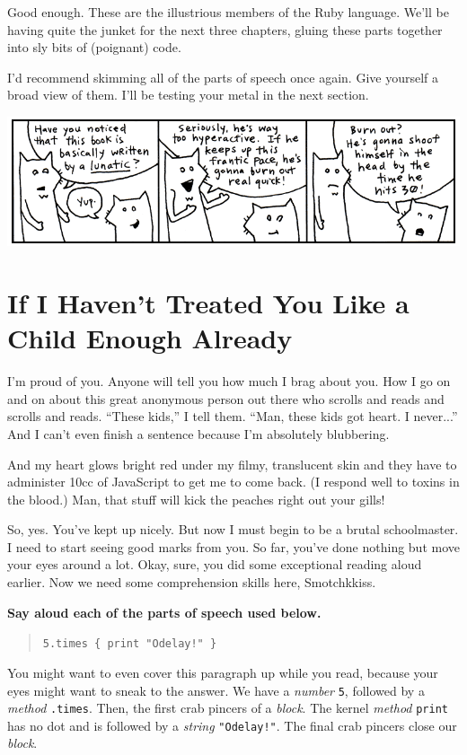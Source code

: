\documentclass[10pt,twoside]{report}
\begin{document}
Good enough.  These are the illustrious members of the Ruby language.
We'll be having quite the junket for the next three chapters, gluing
these parts together into sly bits of (poignant) code.

I'd recommend skimming all of the parts of speech once again.  Give
yourself a broad view of them.  I'll be testing your metal in the next
section.

	\includegraphics[width=1.0\textwidth]{cache/16.png}


\section{If I Haven't Treated You Like a Child Enough Already}


I'm proud of you.  Anyone will tell you how much I brag about you.
How I go on and on about this great anonymous person out there who
scrolls and reads and scrolls and reads.  ``These kids,'' I tell them.
``Man, these kids got heart.  I never...''  And I can't even finish a
sentence because I'm absolutely blubbering.

And my heart glows bright red under my filmy, translucent skin and
they have to administer 10cc of JavaScript to get me to come back.  (I
respond well to toxins in the blood.)  Man, that stuff will kick the
peaches right out your gills!

So, yes.  You've kept up nicely.  But now I must begin to be a brutal
schoolmaster. I need to start seeing good marks from you.  So far,
you've done nothing but move your eyes around a lot.  Okay, sure, you
did some exceptional reading aloud earlier.  Now we need some
comprehension skills here, Smotchkkiss.

{\bf Say aloud each of the parts of speech used below.}

\begin{quote}
\lstinline[breaklines=true]|5.times { print "Odelay!" }|\end{quote}


You might want to even cover this paragraph up while you read, because
your eyes might want to sneak to the answer.  We have a {\em number}
\lstinline[breaklines=true]|5|, followed by a {\em method}
\lstinline[breaklines=true]|.times|.  Then, the first crab pincers of
a {\em block}.  The kernel {\em method}
\lstinline[breaklines=true]|print| has no dot and is followed by a
          {\em string} \lstinline[breaklines=true]|"Odelay!"|.  The
          final crab pincers close our {\em block}.
\end{document}
